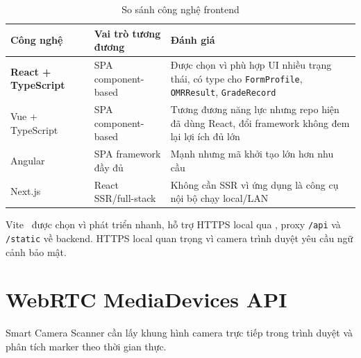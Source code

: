 \begin{table}[H]
\centering
\caption{So sánh công nghệ frontend}
\label{tab:so-sanh-frontend}
\renewcommand{\arraystretch}{1.25}
\begin{tabular}{|>{\raggedright\arraybackslash}p{3cm}|p{4.5cm}|>{\raggedright\arraybackslash}p{7cm}|}
\hline
\textbf{Công nghệ} & \textbf{Vai trò tương đương} & \textbf{Đánh giá} \\
\hline

\textbf{React + TypeScript}~\cite{react} &
SPA component-based &
Được chọn vì phù hợp UI nhiều trạng thái, có type cho \texttt{FormProfile}, \texttt{OMRResult}, \texttt{GradeRecord} \\
\hline

Vue + TypeScript &
SPA component-based &
Tương đương năng lực nhưng repo hiện đã dùng React, đổi framework không đem lại lợi ích đủ lớn \\
\hline

Angular &
SPA framework đầy đủ &
Mạnh nhưng mã khởi tạo lớn hơn nhu cầu \\
\hline

Next.js &
React SSR/full-stack &
Không cần SSR vì ứng dụng là công cụ nội bộ chạy local/LAN \\
\hline

\end{tabular}
\end{table}

Vite~\cite{vite} được chọn vì phát triển nhanh, hỗ trợ HTTPS local qua , proxy \texttt{/api} và \texttt{/static} về backend. HTTPS local quan trọng vì camera trình duyệt yêu cầu ngữ cảnh bảo mật.

\section{WebRTC MediaDevices API}

Smart Camera Scanner cần lấy khung hình camera trực tiếp trong trình duyệt và phân tích marker theo thời gian thực.

